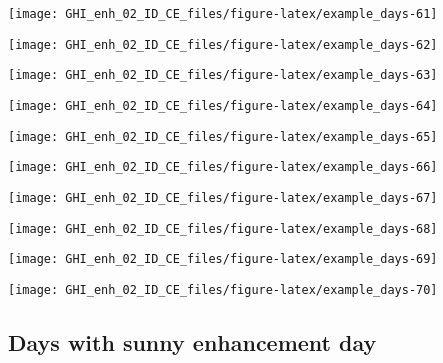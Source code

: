 \documentclass[
  10pt,
  a4paper,oneside]{article}
\begin{document}
\begin{center}\texttt{[image: GHI\_enh\_02\_ID\_CE\_files/figure-latex/example\_days-61]} \end{center}

\begin{center}\texttt{[image: GHI\_enh\_02\_ID\_CE\_files/figure-latex/example\_days-62]} \end{center}

\begin{center}\texttt{[image: GHI\_enh\_02\_ID\_CE\_files/figure-latex/example\_days-63]} \end{center}

\begin{center}\texttt{[image: GHI\_enh\_02\_ID\_CE\_files/figure-latex/example\_days-64]} \end{center}

\begin{center}\texttt{[image: GHI\_enh\_02\_ID\_CE\_files/figure-latex/example\_days-65]} \end{center}

\begin{center}\texttt{[image: GHI\_enh\_02\_ID\_CE\_files/figure-latex/example\_days-66]} \end{center}

\begin{center}\texttt{[image: GHI\_enh\_02\_ID\_CE\_files/figure-latex/example\_days-67]} \end{center}

\begin{center}\texttt{[image: GHI\_enh\_02\_ID\_CE\_files/figure-latex/example\_days-68]} \end{center}

\begin{center}\texttt{[image: GHI\_enh\_02\_ID\_CE\_files/figure-latex/example\_days-69]} \end{center}

\begin{center}\texttt{[image: GHI\_enh\_02\_ID\_CE\_files/figure-latex/example\_days-70]} \end{center}

\FloatBarrier

\hypertarget{days-with-sunny-enhancement-day}{%
\subsection{Days with sunny enhancement day}\label{days-with-sunny-enhancement-day}}
\end{document}
